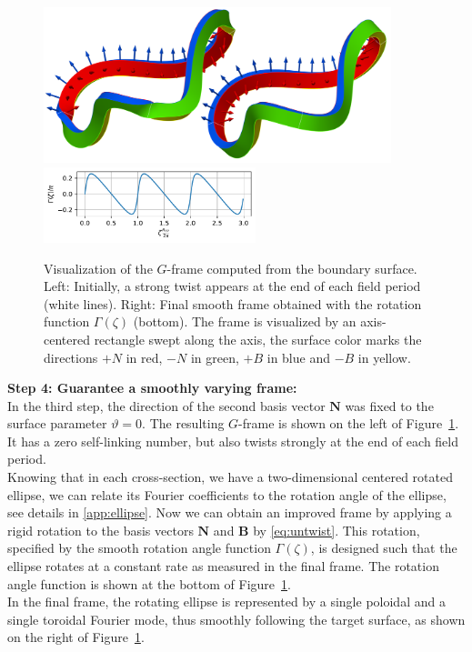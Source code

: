 \documentclass[12pt]{iopart}
\newcommand\hladdedrev[1]{#1} %
\newcommand\hlchangedrev[1]{#1} %
\newcommand\Nnew{{\bm N}}
\newcommand\Bnew{{\bm B}}
\newcommand\GFF{$G$-frame}
\newcommand{\thet}{\vartheta}
\newcommand\linknum[1]{\hlchangedrev{self-linking number{#1}}}
\begin{document}
\begin{figure}[htbp!]
    \centering
    \includegraphics[trim=0 40 0 20,clip,width=0.9\textwidth]{pics/quasr/quasr_visu_twist_vecs_views.png}\\
    \hspace{0.3\textwidth}\includegraphics[width=0.55\textwidth]{pics/quasr/quasr_untwist_gamma_function.pdf}
    \caption{\hladdedrev{Visualization of the \GFF{} computed from the boundary surface. Left:  Initially, a strong twist appears at the end of each field period (white lines). Right: Final smooth frame obtained with the rotation function $\Gamma(\zeta)$ (bottom). The frame is visualized by an axis-centered rectangle swept along the axis, the surface color marks the directions $+N$ in red, $-N$ in green, $+B$ in blue  and $-B$ in yellow.}}
    \label{fig:quasr_untwist}
\end{figure}

\hladdedrev{
\textbf{Step 4: Guarantee a smoothly varying frame:}\\
    In the third step, the direction of the second basis vector $\Nnew$ was fixed to the surface parameter $\thet=0$. The resulting \GFF{} is shown on the left of Figure~\ref{fig:quasr_untwist}. 
    It has a zero \linknum{}, but also twists strongly at the end of each field period. \\
    Knowing that in each cross-section, we have a two-dimensional centered rotated ellipse, we can relate its Fourier coefficients to the  rotation angle of the ellipse, see details in \ref{app:ellipse}. Now we can obtain an improved frame by applying a rigid rotation to the basis vectors $\Nnew$ and $\Bnew$ by \eqref{eq:untwist}.  This rotation, specified by the smooth rotation angle function $\Gamma(\zeta)$, is designed such that the ellipse rotates at a constant rate as measured in the final frame.
    The rotation angle function is shown at the bottom of Figure~\ref{fig:quasr_untwist}. \\
    In the final frame, the rotating ellipse is represented by a single poloidal and a single toroidal Fourier mode, 
    thus smoothly following the target surface, as shown on the right of Figure~\ref{fig:quasr_untwist}.}
\end{document}
